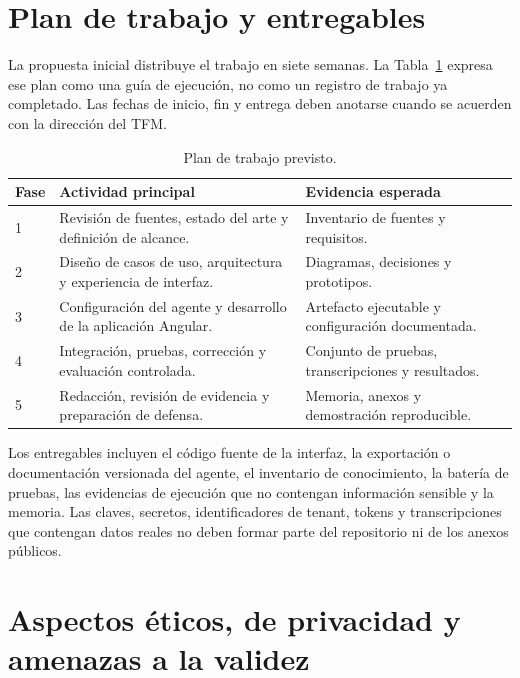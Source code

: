 \section{Plan de trabajo y entregables}
\label{sec:plan-trabajo}

La propuesta inicial distribuye el trabajo en siete semanas. La
Tabla~\ref{tab:plan-trabajo} expresa ese plan como una guía de ejecución, no como
un registro de trabajo ya completado. Las fechas de inicio, fin y entrega deben
anotarse cuando se acuerden con la dirección del TFM.

\begin{table}[H]
\centering
\caption{Plan de trabajo previsto.}
\label{tab:plan-trabajo}
\begin{tabular}{@{}p{}p{}p{}@{}}
\hline
\textbf{Fase} & \textbf{Actividad principal} & \textbf{Evidencia esperada}\\
\hline
1 & Revisión de fuentes, estado del arte y definición de alcance. & Inventario de
fuentes y requisitos.\\
2 & Diseño de casos de uso, arquitectura y experiencia de interfaz. & Diagramas,
decisiones y prototipos.\\
3 & Configuración del agente y desarrollo de la aplicación Angular. & Artefacto
ejecutable y configuración documentada.\\
4 & Integración, pruebas, corrección y evaluación controlada. & Conjunto de
pruebas, transcripciones y resultados.\\
5 & Redacción, revisión de evidencia y preparación de defensa. & Memoria,
anexos y demostración reproducible.\\
\hline
\end{tabular}
\end{table}

Los entregables incluyen el código fuente de la interfaz, la exportación o
documentación versionada del agente, el inventario de conocimiento, la batería de
pruebas, las evidencias de ejecución que no contengan información sensible y la
memoria. Las claves, secretos, identificadores de tenant, tokens y transcripciones
que contengan datos reales no deben formar parte del repositorio ni de los anexos
públicos.

\section{Aspectos éticos, de privacidad y amenazas a la validez}
\label{sec:etica-validez}

